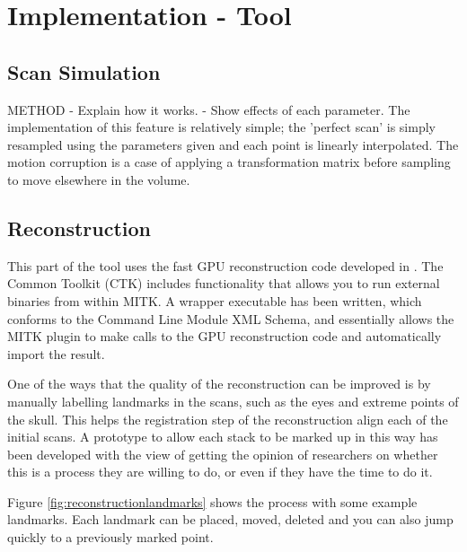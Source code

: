 \chapter{Implementation - Tool}

\newpage
\section{Scan Simulation}\label{section:simulatescan}

METHOD
  - Explain how it works.
  - Show effects of each parameter.
The implementation of this feature is relatively simple; the 'perfect scan' is simply resampled using the parameters given and each point is linearly interpolated. The motion corruption is a case of applying a transformation matrix before sampling to move elsewhere in the volume.

\newpage
\section{Reconstruction}\label{section:reconstruction}
This part of the tool uses the fast GPU reconstruction code developed in \cite{uncertaintysvd}. The Common Toolkit (CTK) includes functionality that allows you to run external binaries from within MITK\cite{ctkcmd}. A wrapper executable has been written, which conforms to the Command Line Module XML Schema, and essentially allows the MITK plugin to make calls to the GPU reconstruction code and automatically import the result.

One of the ways that the quality of the reconstruction can be improved is by manually labelling landmarks in the scans, such as the eyes and extreme points of the skull. This helps the registration step of the reconstruction align each of the initial scans. A prototype to allow each stack to be marked up in this way has been developed with the view of getting the opinion of researchers on whether this is a process they are willing to do, or even if they have the time to do it.

Figure \ref{fig:reconstructionlandmarks} shows the process with some example landmarks. Each landmark can be placed, moved, deleted and you can also jump quickly to a previously marked point.

